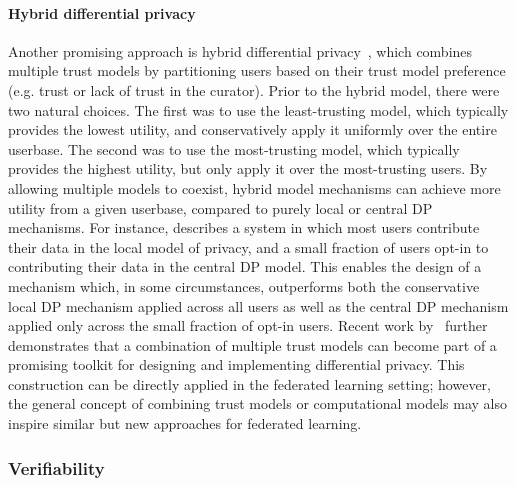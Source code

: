 \paragraph{Hybrid differential privacy}  Another promising approach is hybrid differential privacy~\cite{avent2017blender}, which combines multiple trust models by partitioning users based on their trust model preference (e.g. trust or lack of trust in the curator). Prior to the hybrid model, there were two natural choices. The first was to use the least-trusting model, which typically provides the lowest utility, and conservatively apply it uniformly over the entire userbase. The second was to use the most-trusting model, which typically provides the highest utility, but only apply it over the most-trusting users. By allowing multiple models to coexist, hybrid model mechanisms can achieve more utility from a given userbase, compared to purely local or central DP mechanisms. For instance, \cite{avent2017blender} describes a system in which most users contribute their data in the local model of privacy, and a small fraction of users opt-in to contributing their data in the central DP model. This enables the design of a mechanism which, in some circumstances, outperforms both the conservative local DP mechanism applied across all users as well as the central DP mechanism applied only across the small fraction of opt-in users. Recent work by~\cite{beimel2019power} further demonstrates that a combination of multiple trust models can become part of a promising toolkit for designing and implementing differential privacy. This construction can be directly applied in the federated learning setting; however, the general concept of combining trust models or computational models may also inspire similar but new approaches for federated learning. 



\subsubsection{Verifiability}
\label{sssec:verifiability}


